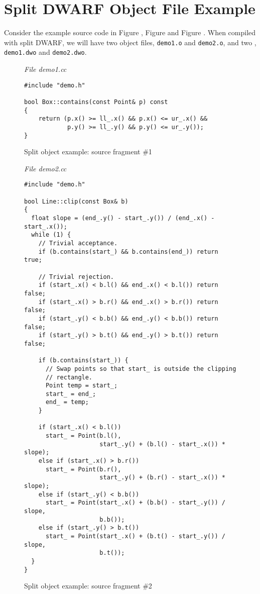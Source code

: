 \clearpage

\section{Split DWARF Object File Example}
\label{app:splitdwarfobjectfileexample}
Consider the example source code in 
Figure , 
Figure  and
Figure .
When compiled with split DWARF, we will have two object files,
\texttt{demo1.o} and \texttt{demo2.o}, and two , 
\texttt{demo1.dwo} and \texttt{demo2.dwo}.

\begin{figure}[b]
\textit{File demo1.cc}
\begin{lstlisting}
#include "demo.h"

bool Box::contains(const Point& p) const
{
    return (p.x() >= ll_.x() && p.x() <= ur_.x() &&
            p.y() >= ll_.y() && p.y() <= ur_.y());
}
\end{lstlisting}
\caption{Split object example: source fragment \#1}
\label{fig:splitobjectexamplesourcefragment1}
\end{figure}

\begin{figure}[h]
\textit{File demo2.cc}
\begin{lstlisting}
#include "demo.h"

bool Line::clip(const Box& b)
{
  float slope = (end_.y() - start_.y()) / (end_.x() - start_.x());
  while (1) {
    // Trivial acceptance.
    if (b.contains(start_) && b.contains(end_)) return true;

    // Trivial rejection.
    if (start_.x() < b.l() && end_.x() < b.l()) return false;
    if (start_.x() > b.r() && end_.x() > b.r()) return false;
    if (start_.y() < b.b() && end_.y() < b.b()) return false;
    if (start_.y() > b.t() && end_.y() > b.t()) return false;

    if (b.contains(start_)) {
      // Swap points so that start_ is outside the clipping 
      // rectangle.
      Point temp = start_;
      start_ = end_;
      end_ = temp;
    }

    if (start_.x() < b.l())
      start_ = Point(b.l(), 
                     start_.y() + (b.l() - start_.x()) * slope);
    else if (start_.x() > b.r())
      start_ = Point(b.r(), 
                     start_.y() + (b.r() - start_.x()) * slope);
    else if (start_.y() < b.b())
      start_ = Point(start_.x() + (b.b() - start_.y()) / slope, 
                     b.b());
    else if (start_.y() > b.t())
      start_ = Point(start_.x() + (b.t() - start_.y()) / slope, 
                     b.t());
  }
}
\end{lstlisting}
\caption{Split object example: source fragment \#2}
\label{fig:splitobjectexamplesourcefragment2}
\end{figure}


